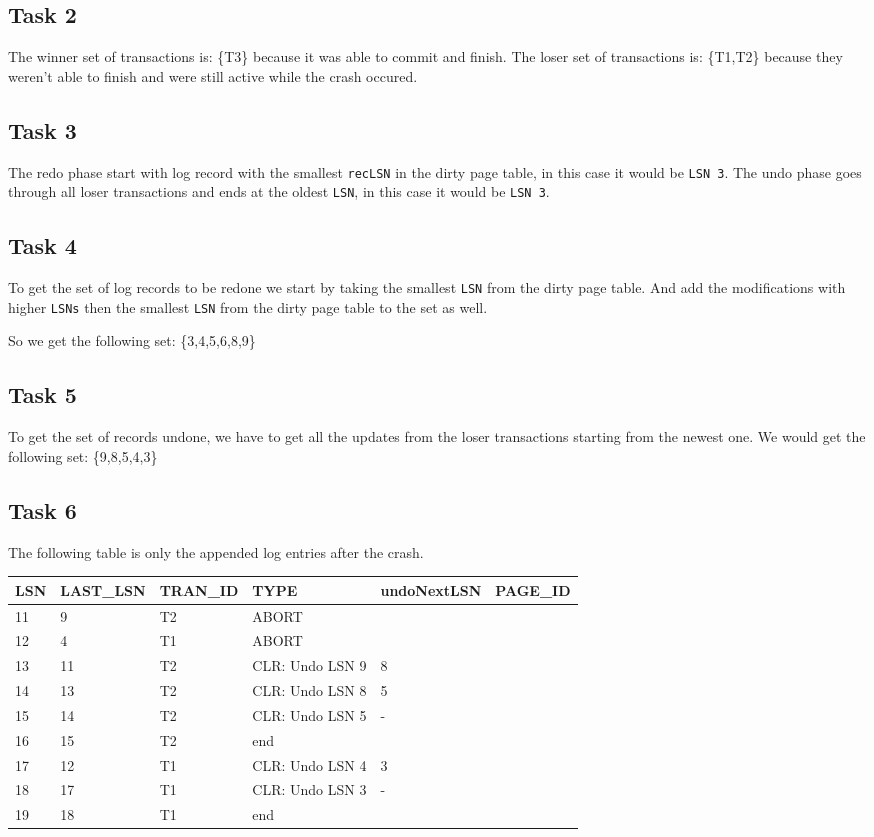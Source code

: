 \documentclass[12pt,a4paper]{article}
\begin{document}
\subsection{Task 2}
The winner set of transactions is: \{T3\} because it was able to commit and finish.
The loser set of transactions is: \{T1,T2\} because they weren't able to finish and were still active while the crash occured.

\subsection{Task 3}
The redo phase start with log record with the smallest \texttt{recLSN} in the dirty page table, in this case it would be \texttt{LSN 3}.
The undo phase goes through all loser transactions and ends at the oldest \texttt{LSN}, in this case it would be \texttt{LSN 3}.
\subsection{Task 4}
To get the set of log records to be redone we start by taking the smallest \texttt{LSN} from the dirty page table. And add the modifications with higher \texttt{LSNs} then the smallest \texttt{LSN} from the dirty page table to the set as well.

So we get the following set: \{3,4,5,6,8,9\}
\subsection{Task 5}
To get the set of records undone, we have to get all the updates from the loser transactions starting from the newest one.
We would get the following set: \{9,8,5,4,3\}
\subsection{Task 6}
The following table is only the appended log entries after the crash.
\begin{table}[!htbp]
    \centering
    \begin{tabularx}{\textwidth}{l|l|l|l|l|l}
        \hline
        LSN & LAST\_LSN & TRAN\_ID & TYPE & undoNextLSN & PAGE\_ID \\ 
        \hline
        11 & 9  & T2 & ABORT & & \\
      	12 & 4  & T1 & ABORT & & \\      
      	13 & 11 & T2 & CLR: Undo LSN 9 &  8 & \\
      	14 & 13 & T2 & CLR: Undo LSN 8 & 5 & \\
      	15 & 14 & T2 & CLR: Undo LSN 5 & - & \\
      	16 & 15 & T2 & end & & \\
      	17 & 12 & T1 & CLR: Undo LSN 4 & 3 & \\
      	18 & 17 & T1 & CLR: Undo LSN 3 & - & \\
      	19 & 18 & T1 & end & & \\     
        \hline
    \end{tabularx}
\end{table}
\end{document}
